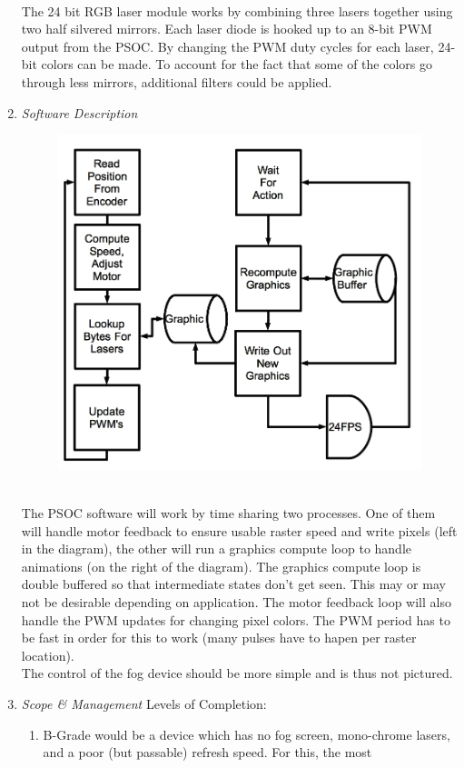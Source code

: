 \documentclass[12pt]{article}
\begin{document}
\begin{enumerate}
\\
The 24 bit RGB laser module works by combining three lasers together
using two half silvered mirrors. Each laser diode is hooked up to an 8-bit
PWM output from the PSOC. By changing the PWM duty cycles for each laser,
24-bit colors can be made.
To account for the fact that some of the colors
go through less mirrors, additional filters could be applied.
\newpage
\item
\emph{Software Description}
\begin{figure}[ht]
\centering
\includegraphics[width=.7\textwidth]{software.jpg}
\end{figure}\\
The PSOC software will work by time sharing two processes. One of them will
handle motor feedback to ensure usable raster speed and write pixels (left in the diagram),
the other will run
a graphics compute loop to handle animations (on the right of the diagram). The graphics compute loop is
double buffered so that intermediate states don't get seen. This may or may not be desirable depending on
application. The motor feedback loop will also handle the PWM updates for changing pixel colors.
The PWM period has to be fast in order for this to work (many pulses have to hapen per raster location).\\The control of
the fog device should be more simple and is thus not pictured.\\
\newpage
\item
\emph{Scope \& Management}
Levels of Completion:\\
\begin{enumerate}
\item B-Grade would be a device which has no fog screen, mono-chrome
lasers, and a poor (but passable) refresh speed. For this, the most

\end{enumerate}
\end{enumerate}
\end{document}
